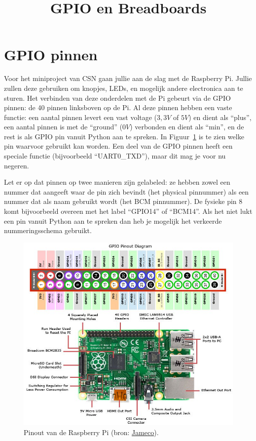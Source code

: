 \documentclass{guide}
\title{GPIO en Breadboards}
\begin{document}
\section{GPIO pinnen}
Voor het miniproject van CSN gaan jullie aan de slag met de Raspberry Pi. Jullie zullen deze gebruiken om knopjes, LEDs, en mogelijk andere electronica aan te sturen. Het verbinden van deze onderdelen met de Pi gebeurt via de GPIO pinnen: de 40 pinnen linksboven op de Pi. Al deze pinnen hebben een vaste functie: een aantal pinnen levert een vast voltage ($3,3V$ of $5V$) en dient als \enquote{plus}, een aantal pinnen is met de \enquote{ground} ($0V$) verbonden en dient als \enquote{min}, en de rest is als GPIO pin vanuit Python aan te spreken. In Figuur~\ref{fig:pinout} is te zien welke pin waarvoor gebruikt kan worden. Een deel van de GPIO pinnen heeft een speciale functie (bijvoorbeeld \enquote{UART0\_TXD}), maar dit mag je voor nu negeren.

Let er op dat pinnen op twee manieren zijn gelabeled: ze hebben zowel een nummer dat aangeeft waar de pin zich bevindt (het physical pinnummer) als een nummer dat als naam gebruikt wordt (het BCM pinnummer). De fysieke pin 8 komt bijvoorbeeld overeen met het label \enquote{GPIO14} of \enquote{BCM14}. Als het niet lukt een pin vanuit Python aan te spreken dan heb je mogelijk het verkeerde nummeringsschema gebruikt.

\begin{figure}[h]
  \centering
  \includegraphics[width=\textwidth]{images/pinout.png}
  \caption{Pinout van de Raspberry Pi (bron: \href{https://www.jameco.com/Jameco/workshop/circuitnotes/raspberry-pi-circuit-note.html}{Jameco}).} \label{fig:pinout}
\end{figure}
\end{document}
